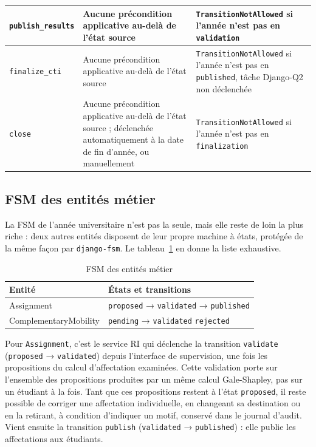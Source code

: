 \begin{longtable}{|p{3.5cm}|p{5.5cm}|p{5.5cm}|}
\hline
\texttt{publish\_results} & Aucune précondition applicative au-delà de l'état source & \texttt{TransitionNotAllowed} si l'année n'est pas en \texttt{validation} \\
\hline
\texttt{finalize\_cti} & Aucune précondition applicative au-delà de l'état source & \texttt{TransitionNotAllowed} si l'année n'est pas en \texttt{published}, tâche Django-Q2 non déclenchée \\
\hline
\texttt{close} & Aucune précondition applicative au-delà de l'état source ; déclenchée automatiquement à la date de fin d'année, ou manuellement & \texttt{TransitionNotAllowed} si l'année n'est pas en \texttt{finalization} \\
\hline
\end{longtable}
\endgroup

\subsection{FSM des entités métier}

La FSM de l'année universitaire n'est pas la seule, mais elle reste de loin la plus riche : deux autres entités disposent de leur propre machine à états, protégée de la même façon par \texttt{django-fsm}. Le tableau~\ref{tab:fsm-entities} en donne la liste exhaustive.

\begin{table}[H]
\centering
\caption{FSM des entités métier}
\label{tab:fsm-entities}
\small
\renewcommand{\arraystretch}{1.4}
\begin{tabular}{|p{4cm}|p{9.5cm}|}
\hline
\rowcolor{gray!20}
\textbf{Entité} & \textbf{États et transitions} \\
\hline
Assignment & \texttt{proposed} → \texttt{validated} → \texttt{published} \\
\hline
ComplementaryMobility & \texttt{pending} → \texttt{validated} \textbar{} \texttt{rejected} \\
\hline
\end{tabular}
\end{table}

Pour \texttt{Assignment}, c'est le service RI qui déclenche la transition \texttt{validate} (\texttt{proposed} → \texttt{validated}) depuis l'interface de supervision, une fois les propositions du calcul d'affectation examinées. Cette validation porte sur l'ensemble des propositions produites par un même calcul Gale-Shapley, pas sur un étudiant à la fois. Tant que ces propositions restent à l'état \texttt{proposed}, il reste possible de corriger une affectation individuelle, en changeant sa destination ou en la retirant, à condition d'indiquer un motif, conservé dans le journal d'audit. Vient ensuite la transition \texttt{publish} (\texttt{validated} → \texttt{published}) : elle publie les affectations aux étudiants.

